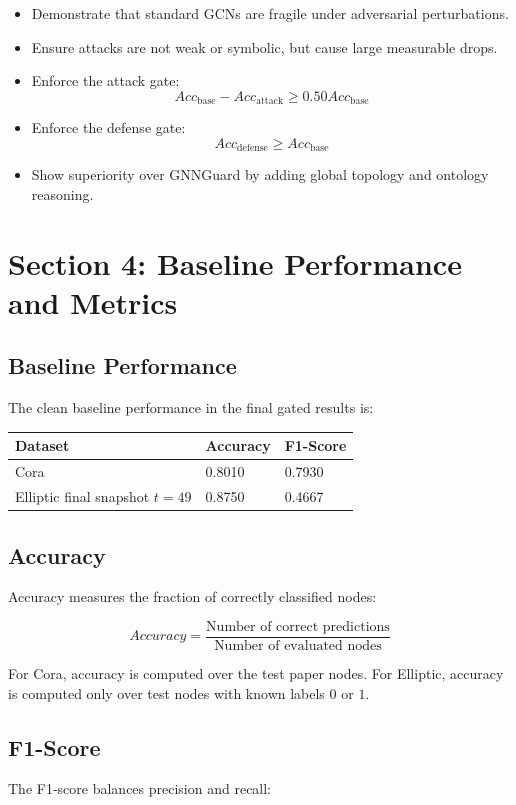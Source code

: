 \documentclass[12pt,a4paper]{article}
\begin{document}
\begin{itemize}
    \item Demonstrate that standard GCNs are fragile under adversarial perturbations.
    \item Ensure attacks are not weak or symbolic, but cause large measurable drops.
    \item Enforce the attack gate:
    $$
    Acc_{\text{base}}-Acc_{\text{attack}}\geq 0.50Acc_{\text{base}}
    $$
    \item Enforce the defense gate:
    $$
    Acc_{\text{defense}}\geq Acc_{\text{base}}
    $$
    \item Show superiority over GNNGuard by adding global topology and ontology reasoning.
\end{itemize}

\section{Section 4: Baseline Performance and Metrics}

\subsection{Baseline Performance}
The clean baseline performance in the final gated results is:

\begin{longtable}{p{2in}p{1.5in}p{1.5in}}
\toprule
\textbf{Dataset} & \textbf{Accuracy} & \textbf{F1-Score}\\
\midrule
Cora & 0.8010 & 0.7930\\
Elliptic final snapshot $t=49$ & 0.8750 & 0.4667\\
\bottomrule
\end{longtable}

\subsection{Accuracy}
Accuracy measures the fraction of correctly classified nodes:

$$
Accuracy=\frac{\text{Number of correct predictions}}{\text{Number of evaluated nodes}}
$$

For Cora, accuracy is computed over the test paper nodes. For Elliptic, accuracy is computed only over test nodes with known labels $0$ or $1$.

\subsection{F1-Score}
The F1-score balances precision and recall:
\end{document}
